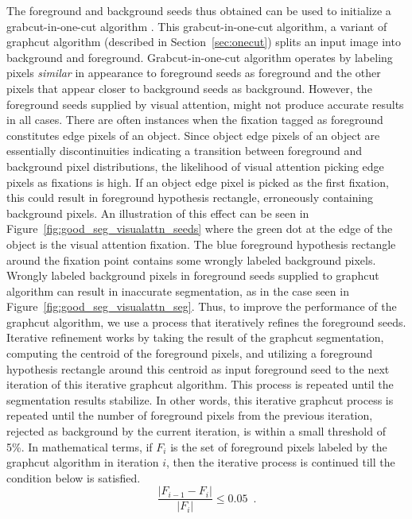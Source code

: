 \documentclass {udthesis}
\begin{document}
The foreground and background seeds thus obtained can be used to initialize a grabcut-in-one-cut algorithm \cite{onecut}. This grabcut-in-one-cut algorithm, a variant of graphcut algorithm (described in Section~\ref{sec:onecut}) splits an input image into background and foreground. Grabcut-in-one-cut algorithm operates by labeling pixels \textit{similar} in appearance to foreground seeds as foreground and the other pixels that appear closer to background seeds as background.
However, the foreground seeds supplied by visual attention, might not produce accurate results in all cases. There are often instances when the fixation tagged as foreground constitutes edge pixels of an object. Since object edge pixels of an object are essentially discontinuities indicating a transition between foreground and background pixel distributions, the likelihood of visual attention picking edge pixels as fixations is high. If an object edge pixel is picked as the first fixation, this could result in foreground hypothesis rectangle, erroneously containing background pixels. An illustration of this effect can be seen in Figure~\ref{fig:good_seg_visualattn_seeds} where the green dot at the edge of the object is the visual attention fixation. The blue foreground hypothesis rectangle around the fixation point contains some wrongly labeled background pixels. Wrongly labeled background pixels in foreground seeds supplied to graphcut algorithm can result in inaccurate segmentation, as in the case seen in 
Figure~\ref{fig:good_seg_visualattn_seg}. Thus, to improve the performance of the graphcut algorithm, we use a process that iteratively refines the foreground seeds. Iterative refinement works by taking the result of the graphcut segmentation, computing the centroid of the foreground pixels, and utilizing a foreground hypothesis rectangle around this centroid as input foreground seed to the next iteration of this iterative graphcut algorithm. This process is repeated until the segmentation results stabilize. In other words, this iterative graphcut process is repeated 
until the number of foreground pixels from the previous iteration, rejected as background by the current iteration, is within a small threshold of 5\%. In mathematical terms, if $F_i$ is the set of foreground pixels labeled by the graphcut algorithm in iteration $i$, then the iterative process is continued till the condition below is satisfied.
%
\begin{equation}
 \label{eqn:seg_threshold}
 \frac{|F_{i-1}-F_{i}|}{|F_i|} \leq 0.05\enspace .
\end{equation}
\end{document}
